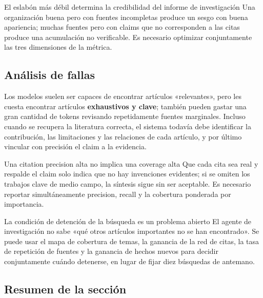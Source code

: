 \documentclass[a4paper]{article}
\begin{document}
\begin{importantbox}{El eslabón más débil determina la credibilidad del informe de investigación}
Una organización buena pero con fuentes incompletas produce un sesgo con buena apariencia; muchas fuentes pero con claims que no corresponden a las citas produce una acumulación no verificable. Es necesario optimizar conjuntamente las tres dimensiones de la métrica.
\end{importantbox}

\subsection{Análisis de fallas}


Los modelos suelen ser capaces de encontrar artículos «relevantes», pero les cuesta encontrar artículos \textbf{exhaustivos y clave}; también pueden gastar una gran cantidad de tokens revisando repetidamente fuentes marginales. Incluso cuando se recupera la literatura correcta, el sistema todavía debe identificar la contribución, las limitaciones y las relaciones de cada artículo, y por último vincular con precisión el claim a la evidencia.

\begin{warningbox}{Una citation precision alta no implica una coverage alta}
Que cada cita sea real y respalde el claim solo indica que no hay invenciones evidentes; si se omiten los trabajos clave de medio campo, la síntesis sigue sin ser aceptable. Es necesario reportar simultáneamente precision, recall y la cobertura ponderada por importancia.
\end{warningbox}

\begin{knowledgebox}{La condición de detención de la búsqueda es un problema abierto}
El agente de investigación no sabe «qué otros artículos importantes no se han encontrado». Se puede usar el mapa de cobertura de temas, la ganancia de la red de citas, la tasa de repetición de fuentes y la ganancia de hechos nuevos para decidir conjuntamente cuándo detenerse, en lugar de fijar diez búsquedas de antemano.
\end{knowledgebox}

\subsection{Resumen de la sección}
\end{document}
